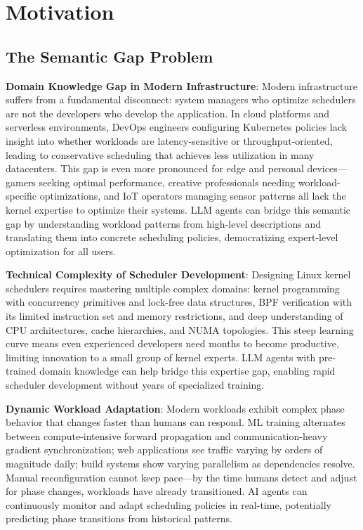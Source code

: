 \section{Motivation}
\label{sec:motivation}

\subsection{The Semantic Gap Problem}

\textbf{Domain Knowledge Gap in Modern Infrastructure}: Modern infrastructure suffers from a fundamental disconnect: system managers who optimize schedulers are not the developers who develop the application. In cloud platforms and serverless environments, DevOps engineers configuring Kubernetes policies lack insight into whether workloads are latency-sensitive or throughput-oriented, leading to conservative scheduling that achieves less utilization in many datacenters. This gap is even more pronounced for edge and personal devices—gamers seeking optimal performance, creative professionals needing workload-specific optimizations, and IoT operators managing sensor patterns all lack the kernel expertise to optimize their systems. LLM agents can bridge this semantic gap by understanding workload patterns from high-level descriptions and translating them into concrete scheduling policies, democratizing expert-level optimization for all users.

\textbf{Technical Complexity of Scheduler Development}: Designing Linux kernel schedulers requires mastering multiple complex domains: kernel programming with concurrency primitives and lock-free data structures, BPF verification with its limited instruction set and memory restrictions, and deep understanding of CPU architectures, cache hierarchies, and NUMA topologies. This steep learning curve means even experienced developers need months to become productive, limiting innovation to a small group of kernel experts. LLM agents with pre-trained domain knowledge can help bridge this expertise gap, enabling rapid scheduler development without years of specialized training.

\textbf{Dynamic Workload Adaptation}: Modern workloads exhibit complex phase behavior that changes faster than humans can respond. ML training alternates between compute-intensive forward propagation and communication-heavy gradient synchronization; web applications see traffic varying by orders of magnitude daily; build systems show varying parallelism as dependencies resolve. Manual reconfiguration cannot keep pace—by the time humans detect and adjust for phase changes, workloads have already transitioned. AI agents can continuously monitor and adapt scheduling policies in real-time, potentially predicting phase transitions from historical patterns.

